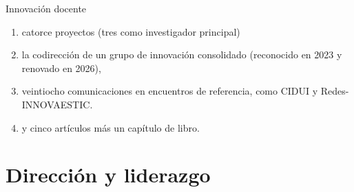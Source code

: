 \documentclass[
  8pt,
  ignorenonframetext,
  aspectratio=169,
  spanish,
]{beamer}
\providecommand{\tightlist}{%
  \setlength{\itemsep}{0pt}\setlength{\parskip}{0pt}}
\newcommand{\roadmapcontent}{}
\begin{document}
\begin{frame}[shrink]{Innovación docente}
{\begin{enumerate}
\tightlist
\item
  catorce proyectos (tres como investigador principal)\\
\item
  la codirección de un grupo de innovación consolidado (reconocido en
  2023 y renovado en 2026),\\
\item
  veintiocho comunicaciones en encuentros de referencia, como CIDUI y
  Redes-INNOVAESTIC.
\item
  y cinco artículos más un capítulo de libro.\\
\end{enumerate}}

\gdef\roadmapcontent{{\scriptsize \mbox{\color{mDarkTeal}\bfseries Parte 1 · Currículum}\quad \mbox{\color{black!40}Parte 2 · Propuesta docente}\quad \mbox{\color{black!40}Parte 3 · Propuesta investigadora: Creative collaborations}\par}
\vspace{0.8em}
{\large \mbox{\color{black!40}Investigación y transferencia}~· \mbox{\color{black!40}Docencia}~· \mbox{\color{mDarkTeal}\bfseries Dirección y liderazgo}\par}}
\end{frame}

\section{Dirección y liderazgo}\label{direcciuxf3n-y-liderazgo}

\end{document}
